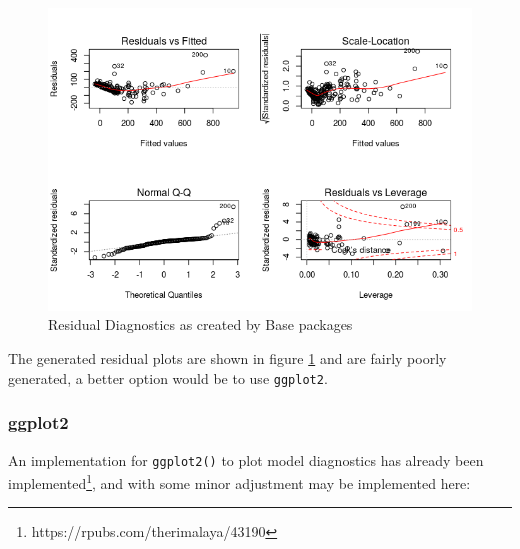 \documentclass[
]{article}
\newcommand{\passthrough}[1]{#1}
\begin{document}
\begin{figure}
	\centering
	\includegraphics[width=0.7\linewidth]{SecAssignment_files/figure-html/unnamed-chunk-17-1.png}
	\caption{Residual Diagnostics as created by Base packages}
	\label{baseresplot}
\end{figure}


The generated residual plots are shown in figure \ref{baseresplot} and are fairly poorly generated, a better option would be
to use \verb|ggplot2|.


\hypertarget{ggplot2}{%
\subsubsection{ggplot2}\label{ggplot2}}

An implementation for \passthrough{\lstinline!ggplot2()!} to plot model
diagnostics has already been implemented\footnote{https://rpubs.com/therimalaya/43190}, and with some minor adjustment may be implemented here:
\end{document}
